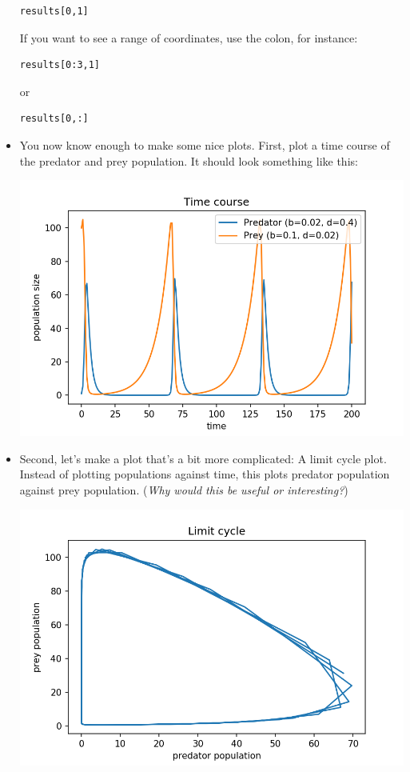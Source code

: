 \documentclass[pdflatex,a4paper]{article}
\begin{document}
\begin{itemize}
\begin{lstlisting}
results[0,1]
\end{lstlisting}

If you want to see a range of coordinates, use the colon, for instance: 

\begin{lstlisting}
results[0:3,1]
\end{lstlisting}

or

\begin{lstlisting}
results[0,:]
\end{lstlisting}

\item

You now know enough to make some nice plots. First, plot a time course of the predator and prey population. It should look something like this:

\includegraphics{time_course0.png}

\item

Second, let's make a plot that's a bit more complicated: A limit cycle plot. Instead of plotting populations against time, this plots predator population against prey population. (\emph{Why would this be useful or interesting?})

\includegraphics{limit_cycle0.png}

\end{itemize}
\end{document}
